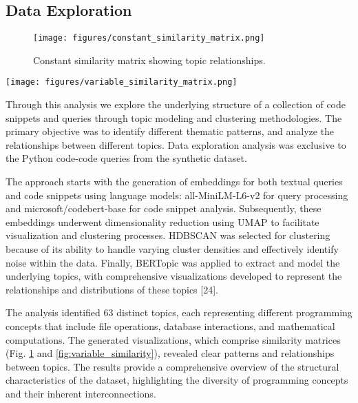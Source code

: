 \documentclass[conference]{IEEEtran}
\begin{document}
\subsection{Data Exploration}

\begin{figure}[htbp]
\centering
\texttt{[image: figures/constant\_similarity\_matrix.png]}
\caption{Constant similarity matrix showing topic relationships.}
\label{fig:constant_similarity}
\end{figure}

\begin{figure*}[htbp]
\centering
\texttt{[image: figures/variable\_similarity\_matrix.png]}
\caption{Variable similarity matrix demonstrating cluster distributions.}
\label{fig:variable_similarity}
\end{figure*}


Through this analysis we explore the underlying structure of a collection of code snippets and queries through topic modeling and clustering methodologies. The primary objective was to identify different thematic patterns, and analyze the relationships between different topics. Data exploration analysis was exclusive to the Python code-code queries from the synthetic dataset.

The approach starts with the generation of embeddings for both textual queries and code snippets using language models: all-MiniLM-L6-v2 for query processing and microsoft/codebert-base for code snippet analysis. Subsequently, these embeddings underwent dimensionality reduction using UMAP to facilitate visualization and clustering processes. HDBSCAN was selected for clustering because of its ability to handle varying cluster densities and effectively identify noise within the data. Finally, BERTopic was applied to extract and model the underlying topics, with comprehensive visualizations developed to represent the relationships and distributions of these topics [24].

The analysis identified 63 distinct topics, each representing different programming concepts that include file operations, database interactions, and mathematical computations. The generated visualizations, which comprise similarity matrices (Fig. \ref{fig:constant_similarity} and \ref{fig:variable_similarity}), revealed clear patterns and relationships between topics. The results provide a comprehensive overview of the structural characteristics of the dataset, highlighting the diversity of programming concepts and their inherent interconnections.
\end{document}
